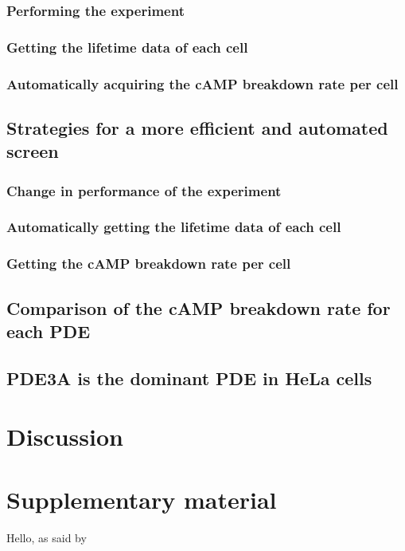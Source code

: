 \documentclass[a4paper,11pt,oneside]{book}
\begin{document}
\subsection{Performing the experiment}


\subsection{Getting the lifetime data of each cell}


\subsection{Automatically acquiring the cAMP breakdown rate per cell}


\section{Strategies for a more efficient and automated screen}
\subsection{Change in performance of the experiment}


\subsection{Automatically getting the lifetime data of each cell}


\subsection{Getting the cAMP breakdown rate per cell }


\section{Comparison of the cAMP breakdown rate for each PDE}


\section{PDE3A is the dominant PDE in HeLa cells}






\newpage
\chapter{Discussion}
\newpage

\newpage
\chapter{Supplementary material}

Hello, as said by \cite{bos2006}





\end{document}
